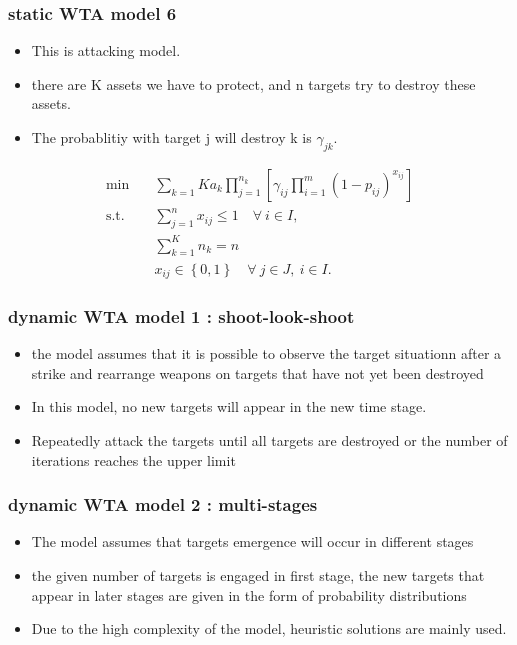 \documentclass[CJK,10pt]{beamer}
\begin{document}
\begin{frame}
    \frametitle{static WTA model 6}
    \begin{itemize}
        \item This is attacking model.
        \item there are K assets we have to protect, and n targets try to destroy these assets. 
        \item The probablitiy with target j will destroy k is $\gamma_{jk}$. 
    \end{itemize}
    \begin{align*} \tag{S6}
        \min\quad & \sum_{k=1}{K}a_k\prod_{j=1}^{n_k}\left[ \gamma_{ij} \prod_{i=1}^m (1 -  p_{ij})^{x_{ij}}\right]\\
        \mathrm{s. t.}\quad &\sum_{j=1}^n x_{ij} \leq 1\quad \forall ~i \in I,\\
        & \sum_{k=1}^{K}n_k = n\\
        & x_{ij} \in \left\{ 0,1 \right\} \quad \forall~ j\in J , ~ i \in I.
    \end{align*}
\end{frame}

\begin{frame}
    \frametitle{dynamic WTA model 1 : shoot-look-shoot}
    \begin{itemize}
        \item the model assumes that it is possible to observe the target situationn after a strike and rearrange weapons on targets that have not yet been destroyed
        \item In this model, no new targets will appear in the new time stage.
        \item Repeatedly attack the targets until all targets are destroyed or the number of iterations reaches the upper limit
    \end{itemize}
\end{frame}

\begin{frame}
    \frametitle{dynamic WTA model 2 : multi-stages}
    \begin{itemize}
        \item The model assumes that targets emergence will occur in different stages
        \item the given number of targets is engaged in first stage, the new targets that appear in later stages are given in the form of probability distributions
        \item Due to the high complexity of the model, heuristic solutions are mainly used.
    \end{itemize}
\end{frame}
\end{document}

